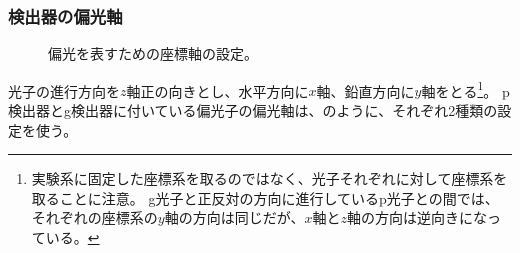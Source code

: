 \documentclass[10pt,b5paper,papersize,dvipdfmx]{jsbook}
\begin{document}
%
\subsubsection{検出器の偏光軸} %

\begin{figure}[ht]
  \centering
  
  \caption{偏光を表すための座標軸の設定。} %
  \label{fig:zahyou-jiku}
\end{figure}

光子の進行方向を$z$軸正の向きとし、水平方向に$x$軸、鉛直方向に$y$軸をとる\footnote{
  実験系に固定した座標系を取るのではなく、光子それぞれに対して座標系を取ることに注意。
  g光子と正反対の方向に進行しているp光子との間では、それぞれの座標系の$y$軸の方向は同じだが、$x$軸と$z$軸の方向は逆向きになっている。
}。
p検出器とg検出器に付いている偏光子の偏光軸は、のように、それぞれ2種類の設定を使う。



\end{document}
